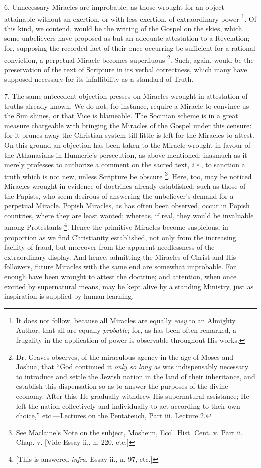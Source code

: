 6. Unnecessary Miracles are improbable; as those
wrought for an object attainable without an exertion, or with less
exertion, of extraordinary power \footnote{It does not follow, because all Miracles are
equally \emph{easy} to an Almighty Author, that all are equally \emph{probable};
for, as has been often remarked, a frugality in the application of
power is observable throughout His works.}. Of this kind, we contend,
would be the writing of the Gospel on the skies, which some
unbelievers have proposed as but an adequate attestation to a
Revelation; for, supposing the recorded fact of their once occurring
be sufficient for a rational conviction, a perpetual Miracle becomes
superfluous \footnote{Dr. Graves observes, of the miraculous agency
in the age of Moses and Joshua, that ``God continued it \emph{only so
long as} was indispensably necessary to introduce and settle the
Jewish nation in the land of their inheritance, and establish this
dispensation so as to answer the purposes of the divine economy. After
this, He gradually withdrew His supernatural assistance; He left the
nation collectively and individually to act according to their own
choice,'' etc.—Lectures on the Pentateuch, Part iii. Lecture 2.}. Such, again, would be the preservation of the
text of Scripture in its verbal correctness, which many have supposed
necessary for its infallibility as a standard of Truth.

7. The same antecedent objection presses on
Miracles wrought in attestation of truths already known. We do not,
for instance, require a Miracle to convince us the Sun shines, or
that Vice is blameable. The Socinian scheme is in a great measure
chargeable with bringing the Miracles of the Gospel under this
censure: for it prunes away the Christian system till little is left
for the Miracles to attest. On this ground an objection has been taken
to the Miracle wrought in favour of the Athanasians in Hunneric's
persecution, as above mentioned; inasmuch as it merely professes to
authorize a comment on the sacred text, \emph{i.e}., to sanction a
truth which is not new, unless Scripture be obscure \footnote{See Maclaine's Note on the subject,
Mosheim, Eccl. Hist. Cent. v. Part ii. Chap. v. [Vide Essay ii., n.
220, etc.]}. Here,
too, may be noticed Miracles wrought in evidence of doctrines already
established; such as those of the Papists, who seem desirous of
answering the unbeliever's demand for a perpetual Miracle. Popish
Miracles, as has often been observed, occur in Popish countries, where
they are least wanted; whereas, if real, they would be invaluable
among Protestants \footnote{[This is answered \emph{infra}, Essay ii., n.
97, etc.]}. Hence the primitive Miracles become
suspicious, in proportion as we find Christianity established, not
only from the increasing facility of fraud, but moreover from the
apparent needlessness of the extraordinary display. And hence,
admitting the Miracles of Christ and His followers, future Miracles
with the same end are somewhat improbable. For enough have been
wrought to attest the doctrine; and attention, when once excited
by supernatural means, may be kept alive by a standing Ministry, just
as inspiration is supplied by human learning.

